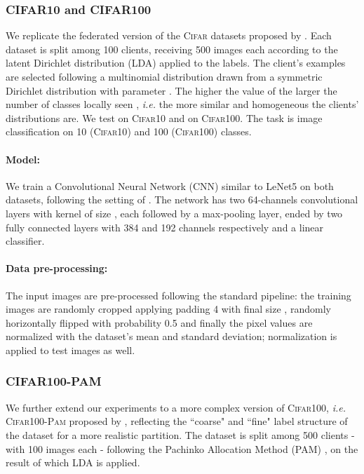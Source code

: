 \subsubsection{CIFAR10 and CIFAR100} We replicate the federated version of the \textsc{Cifar} datasets proposed by \cite{hsu2019measuring}. Each dataset is split among 100 clients, receiving 500 images each according to the latent Dirichlet distribution (LDA) applied to the labels. The client's examples are selected following a multinomial distribution drawn from a symmetric Dirichlet distribution with parameter . The higher the value of  the larger the number of classes locally seen , \textit{i.e.} the more similar and homogeneous the clients' distributions are. We test  on \textsc{Cifar10} and  on \textsc{Cifar100}. The task is image classification on 10 (\textsc{Cifar10}) and 100 (\textsc{Cifar100}) classes. 
\paragraph{Model:} We train a Convolutional Neural Network (CNN) similar to LeNet5 \cite{lecun1998gradient} on both datasets, following the setting of \cite{hsu2020federated}. The network has two 64-channels convolutional layers with kernel of size , each followed by a  max-pooling layer, ended by two fully connected layers with 384 and 192 channels respectively and a linear classifier. 
\paragraph{Data pre-processing:} The  input images are pre-processed following the standard pipeline: the training images are randomly cropped applying padding 4 with final size , randomly horizontally flipped with probability 0.5 and finally the pixel values are normalized with the dataset's mean and standard deviation; normalization is applied to test images as well.

\subsubsection{CIFAR100-PAM} We further extend our experiments to a more complex version of \textsc{Cifar100}, \textit{i.e.} \textsc{Cifar100-Pam} proposed by \cite{reddi2020adaptive}, reflecting the ``coarse" and ``fine" label structure of the dataset for a more realistic partition. The dataset is split among 500 clients - with 100 images each - following the Pachinko Allocation Method (PAM) \cite{li2006pachinko}, on the result of which LDA is applied. 
